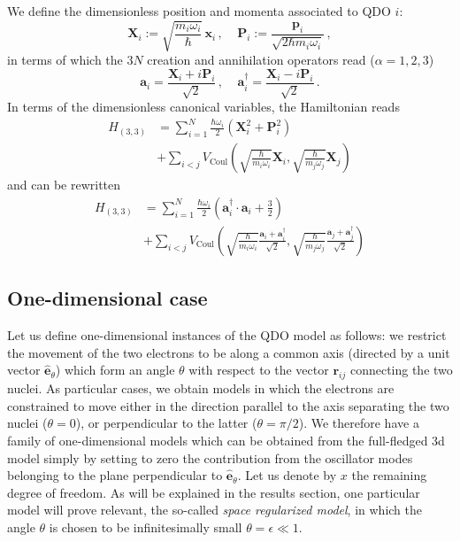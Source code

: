 \documentclass[reprint, amsmath, amssymb, aps]{revtex4-2}
\begin{document}
        We define the dimensionless position and momenta associated to QDO $i$:
        \begin{equation}
            \bm{X}_i := \sqrt{\frac{m_i\omega_i}{\hbar}}\,\bm{x}_i\,,\ \ \ \ \ \bm{P}_i := \frac{\bm{p}_i}{\sqrt{2\hbar m_i\omega_i}}\,,
        \end{equation}
        in terms of which the $3N$ creation and annihilation operators read ($\alpha=1,2,3$)
        \begin{equation}
            \bm a_{i} = \frac{\bm X_{i} + i\bm P_{i}}{\sqrt 2}\,,\ \ \ \ \ \bm a^\dagger_{i} = \frac{\bm X_{i} - i\bm P_{i}}{\sqrt 2}\,.
        \end{equation}
        In terms of the dimensionless canonical variables, the Hamiltonian reads
        \begin{equation}
        \begin{split}
            H_{(3,3)} &= \sum_{i=1}^N\frac{\hbar\omega_i}{2}\left(\bm X_{i}^2 + \bm P_{i}^2\right) \\
            & + \sum_{i<j}V_\text{Coul}\left(\sqrt{\frac{\hbar}{m_i\omega_i}}\bm{X} _i, \sqrt{\frac{\hbar}{m_j\omega_j}}\bm{X} _j\right)
        \end{split}
        \end{equation}
        and can be rewritten
        \begin{equation}
        \begin{split}
            H_{(3,3)} &= \sum_{i=1}^N\frac{\hbar\omega_i}{2}\left(\bm a_{i}^\dagger\cdot\bm a_{i} +\frac{3}{2}\right) \\
            & + \sum_{i<j}V_\text{Coul}\left(\sqrt{\frac{\hbar}{m_i\omega_i}}\frac{\bm a_i + \bm a_i^\dagger}{\sqrt 2}, \sqrt{\frac{\hbar}{m_j\omega_j}}\frac{\bm a_j + \bm a_j^\dagger}{\sqrt 2}\right)
        \end{split}
        \end{equation}
    \subsection{One-dimensional case}

        Let us define one-dimensional instances of the QDO model as follows: we restrict the movement of the two electrons to be along a common axis (directed by a unit vector $\hat{\bm e}_\theta$) which form an angle $\theta$ with respect to the vector $\bm r_{ij}$ connecting the two nuclei. As particular cases, we obtain models in which the electrons are constrained to move either in the direction parallel to the axis separating the two nuclei ($\theta=0$), or perpendicular to the latter ($\theta=\pi/2$). We therefore have a family of one-dimensional models which can be obtained from the full-fledged 3d model simply by setting to zero the contribution from the oscillator modes belonging to the plane perpendicular to $\hat{\bm e}_\theta$. Let us denote by $x$ the remaining degree of freedom. As will be explained in the results section, one particular model will prove relevant, the so-called \textit{space regularized model}, in which the angle $\theta$ is chosen to be infinitesimally small $\theta=\epsilon\ll 1$.
\end{document}
